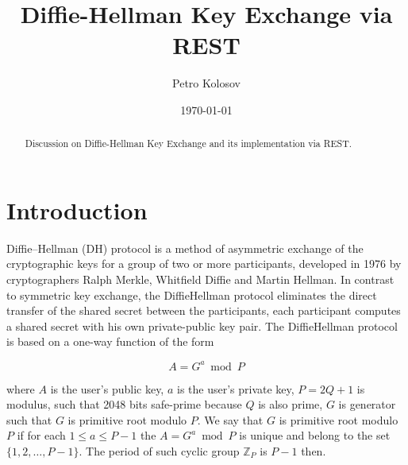 \documentclass[12pt,letterpaper,oneside,reqno]{amsart}
\title[Diffie-Hellman Key Exchange via REST]
{Diffie-Hellman Key Exchange via REST}
\author[Petro Kolosov]{Petro Kolosov}
\date{\today}
\numberwithin{equation}{section}
\begin{document}
    \begin{abstract}
        Discussion on Diffie-Hellman Key Exchange and its implementation via REST.
    \end{abstract}

    \maketitle

    \tableofcontents


    \section{Introduction} \label{sec:introduction}
    Diffie--Hellman (DH) protocol is a method of asymmetric exchange
    of the cryptographic keys for a group of two or more participants,
    developed in 1976 by cryptographers Ralph Merkle, Whitfield Diffie and Martin Hellman.
    In contrast to symmetric key exchange, the Diffie\textendash Hellman protocol eliminates the direct transfer of the shared secret
    between the participants, each participant computes a shared secret with his own private-public key pair.
    The Diffie\textendash Hellman protocol is based on a one-way function of the form

    \begin{equation}
        A = G ^ a \bmod P \label{eq:equation}
    \end{equation}

    where $A$ is the user's public key,
    $a$ is the user's private key,
    $P=2Q+1$ is modulus, such that 2048 bits safe-prime because $Q$ is also prime,
    $G$ is generator such that $G$ is primitive root modulo $P$.
    We say that $G$ is primitive root modulo $P$ if for each $1 \leq a \leq P - 1$ the $A = G ^ a \bmod P$
    is unique and belong to the set $\{1, 2, \dots, P-1\}$.
    The period of such cyclic group $\mathbb{Z}_{P}$ is $P-1$ then.
\end{document}
